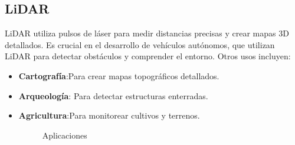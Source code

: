 \subsection{LiDAR}
LiDAR utiliza pulsos de láser para medir distancias precisas y crear mapas 3D detallados. Es crucial en el desarrollo de vehículos autónomos, que utilizan LiDAR para detectar obstáculos y comprender el entorno. Otros usos incluyen:
\begin{itemize}
	\item \textbf{Cartografía}:Para crear mapas topográficos detallados.
	\item \textbf{Arqueología}: Para detectar estructuras enterradas.
	\item \textbf{Agricultura}:Para monitorear cultivos y terrenos.
	\begin{figure}[h]
	\centering
	\hfill
	\caption{Aplicaciones }
	\label{fig:ApliLid}
	\end{figure}
\end{itemize}\newpage